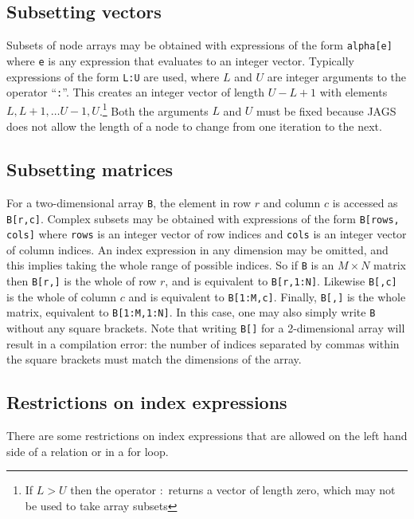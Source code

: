 \documentclass[11pt, a4paper, titlepage]{report}
\begin{document}
\subsection{Subsetting vectors}

Subsets of node arrays may be obtained with expressions of the form
\verb+alpha[e]+ where \verb+e+ is any expression that evaluates to an
integer vector. Typically expressions of the form \verb+L:U+ are used,
where $L$ and $U$ are integer arguments to the operator ``\texttt{:}''. This
creates an integer vector of length $U - L + 1$ with elements $L, L+1,
\ldots U-1, U$.\footnote{If $L > U$ then the operator $:$ returns a
  vector of length zero, which may not be used to take array subsets}
Both the arguments $L$ and $U$ must be fixed because JAGS does not
allow the length of a node to change from one iteration to the next.

\subsection{Subsetting matrices}

For a two-dimensional array \verb+B+, the element in row $r$ and
column $c$ is accessed as \verb+B[r,c]+. Complex subsets may be
obtained with expressions of the form \verb+B[rows, cols]+ where
\verb+rows+ is an integer vector of row indices and \verb+cols+ is an
integer vector of column indices.  An index expression in any
dimension may be omitted, and this implies taking the whole range of
possible indices. So if \verb+B+ is an $M \times N$ matrix then
\verb+B[r,]+ is the whole of row $r$, and is equivalent to
\verb+B[r,1:N]+. Likewise \verb+B[,c]+ is the whole of column $c$ and
is equivalent to \verb+B[1:M,c]+. Finally, \verb+B[,]+ is the whole
matrix, equivalent to \verb+B[1:M,1:N]+. In this case, one may also
simply write \verb+B+ without any square brackets. Note that writing
\verb+B[]+ for a 2-dimensional array will result in a compilation
error: the number of indices separated by commas within the square
brackets must match the dimensions of the array.

\subsection{Restrictions on index expressions}

There are some restrictions on index expressions that are allowed on
the left hand side of a relation or in a for loop.
\end{document}
